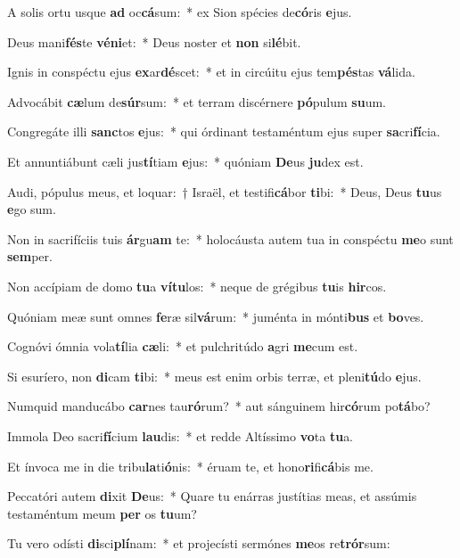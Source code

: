 \item A solis ortu usque \textbf{ad} oc\textbf{cá}sum:~* ex Sion spécies de\textbf{có}ris \textbf{e}jus.
\item Deus mani\textbf{fés}te \textbf{vé}\textbf{ni}et:~* Deus noster et \textbf{non} si\textbf{lé}bit.
\item Ignis in conspéctu ejus \textbf{ex}ar\textbf{dé}scet:~* et in circúitu ejus tem\textbf{pés}tas \textbf{vá}lida.
\item Advocábit \textbf{cæ}lum de\textbf{súr}sum:~* et terram discérnere \textbf{pó}pulum \textbf{su}um.
\item Congregáte illi \textbf{sanc}tos \textbf{e}jus:~* qui órdinant testaméntum ejus super \textbf{sa}cri\textbf{fí}cia.
\item Et annuntiábunt cæli jus\textbf{tí}tiam \textbf{e}jus:~* quóniam \textbf{De}us \textbf{ju}dex est.
\item Audi, pópulus meus, et loquar:~† Israël, et testifi\textbf{cá}bor \textbf{ti}bi:~* Deus, Deus \textbf{tu}us \textbf{e}go sum.
\item Non in sacrifíciis tuis \textbf{ár}gu\textbf{am} te:~* holocáusta autem tua in conspéctu \textbf{me}o sunt \textbf{sem}per.
\item Non accípiam de domo \textbf{tu}a \textbf{ví}\textbf{tu}los:~* neque de grégibus \textbf{tu}is \textbf{hir}cos.
\item Quóniam meæ sunt omnes \textbf{fe}ræ sil\textbf{vá}rum:~* juménta in mónti\textbf{bus} et \textbf{bo}ves.
\item Cognóvi ómnia vola\textbf{tí}lia \textbf{cæ}li:~* et pulchritúdo \textbf{a}gri \textbf{me}cum est.
\item Si esuríero, non \textbf{di}cam \textbf{ti}bi:~* meus est enim orbis terræ, et pleni\textbf{tú}do \textbf{e}jus.
\item Numquid manducábo \textbf{car}nes tau\textbf{ró}rum?~* aut sánguinem hir\textbf{có}rum po\textbf{tá}bo?
\item Immola Deo sacri\textbf{fí}cium \textbf{lau}dis:~* et redde Altíssimo \textbf{vo}ta \textbf{tu}a.
\item Et ínvoca me in die tribu\textbf{la}ti\textbf{ó}nis:~* éruam te, et hono\textbf{ri}fi\textbf{cá}bis me.
\item Peccatóri autem \textbf{di}xit \textbf{De}us:~* Quare tu enárras justítias meas, et assúmis testaméntum meum \textbf{per} os \textbf{tu}um?
\item Tu vero odísti \textbf{di}sci\textbf{plí}nam:~* et projecísti sermónes \textbf{me}os re\textbf{trór}sum:

